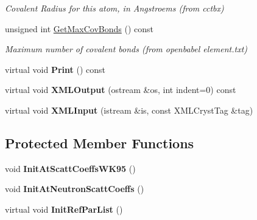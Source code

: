 \begin{DoxyCompactItemize}
\begin{DoxyCompactList}\small\item\em Covalent Radius for this atom, in Angstroems (from cctbx) \end{DoxyCompactList}\item 
\mbox{\label{class_obj_cryst_1_1_scattering_power_atom_a92354511acb0a7b562797098a32ed0fc}} 
unsigned int \mbox{\hyperlink{class_obj_cryst_1_1_scattering_power_atom_a92354511acb0a7b562797098a32ed0fc}{Get\+Max\+Cov\+Bonds}} () const
\begin{DoxyCompactList}\small\item\em Maximum number of covalent bonds (from openbabel element.\+txt) \end{DoxyCompactList}\item 
\mbox{\label{class_obj_cryst_1_1_scattering_power_atom_a2e96d157ab18e50c496357a3df4226ff}} 
virtual void {\bfseries Print} () const
\item 
\mbox{\label{class_obj_cryst_1_1_scattering_power_atom_ad432a9d140d6baa24d281b242011cedc}} 
virtual void {\bfseries X\+M\+L\+Output} (ostream \&os, int indent=0) const
\item 
\mbox{\label{class_obj_cryst_1_1_scattering_power_atom_a5a026bbdfd2ff0f8740cabfb593beb08}} 
virtual void {\bfseries X\+M\+L\+Input} (istream \&is, const X\+M\+L\+Cryst\+Tag \&tag)
\end{DoxyCompactItemize}
\subsection*{Protected Member Functions}
\begin{DoxyCompactItemize}
\item 
\mbox{\label{class_obj_cryst_1_1_scattering_power_atom_ae568eeebd9f34df52c7234e8aba0c5a4}} 
void {\bfseries Init\+At\+Scatt\+Coeffs\+W\+K95} ()
\item 
\mbox{\label{class_obj_cryst_1_1_scattering_power_atom_a3a768af645d05959ab7be36656e9e615}} 
void {\bfseries Init\+At\+Neutron\+Scatt\+Coeffs} ()
\item 
\mbox{\label{class_obj_cryst_1_1_scattering_power_atom_a09c269f6ed0ab2adb552e5d9f1f11c2c}} 
virtual void {\bfseries Init\+Ref\+Par\+List} ()
\end{DoxyCompactItemize}
